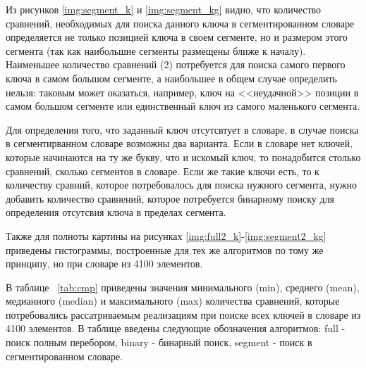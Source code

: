 Из рисунков \ref{img:segment_k} и \ref{img:segment_kg} видно, что количество сравнений, необходимых для поиска данного ключа в сегментированном словаре определяется не только позицией ключа в своем сегменте, но и размером этого сегмента (так как наибольшие сегменты размещены ближе к началу). Наименьшее количество сравнений (2) потребуется для поиска самого первого ключа в самом большом сегменте, а наибольшее в общем случае определить нельзя: таковым может оказаться, например, ключ на <<неудачной>> позиции в самом большом сегменте или единственный ключ из самого маленького сегмента. 

Для определения того, что заданный ключ отсутсвтует в словаре, в случае поиска в сегментирванном словаре возможны два варианта. Если в словаре нет ключей, которые начинаются на ту же букву, что и искомый ключ, то понадобится столько сравнений, сколько сегментов в словаре. Если же такие ключи есть, то к количеству сравний, которое потребовалось для поиска нужного сегмента, нужно добавить количество сравнений, которое потребуется бинарному поиску для определения отсутсвия ключа в пределах сегмента.

Также для полноты картины на рисунках \ref{img:full2_k}-\ref{img:segment2_kg} приведены гистограммы, построенные для тех же алгоритмов по тому же принципу, но при словаре из 4100 элементов. 

\clearpage
{}

\clearpage
{}

\clearpage
{}

\clearpage
В таблице ~\ref{tab:cmp} приведены значения минимального (min), среднего (mean), медианного (median) и максимального (max) количества сравнений, которые потребовались рассатриваемым реализациям при поиске всех ключей в словаре из 4100 элементов. В таблице введены следующие обозначения алгоритмов: full - поиск полным перебором, binary - бинарный поиск, segment - поиск в сегментированном словаре.

